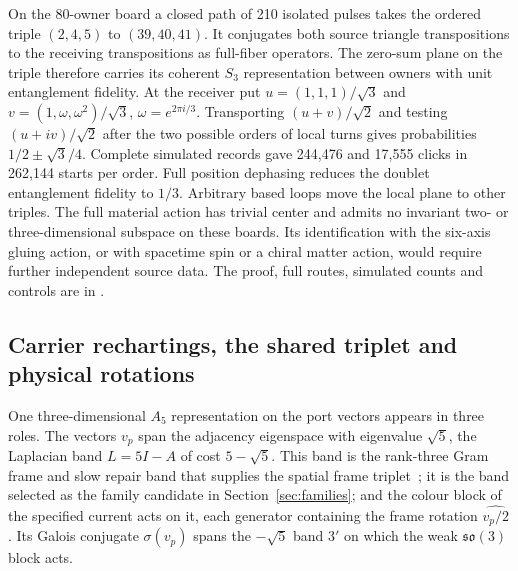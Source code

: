 \documentclass[11pt]{article}
\begin{document}
On the 80-owner board a closed path of 210 isolated pulses takes the ordered
triple \((2,4,5)\) to \((39,40,41)\). It conjugates both source triangle
transpositions to the receiving transpositions as full-fiber operators.
The zero-sum plane on the triple therefore carries its coherent \(S_3\)
representation between owners with unit entanglement fidelity. At the
receiver put \(u=(1,1,1)/\sqrt3\) and
\(v=(1,\omega,\omega^2)/\sqrt3\), \(\omega=e^{2\pi i/3}\). Transporting
\((u+v)/\sqrt2\) and testing \((u+iv)/\sqrt2\) after the two possible orders
of local turns gives probabilities \(1/2\pm\sqrt3/4\). Complete simulated
records gave 244,476 and 17,555 clicks in 262,144 starts per order. Full
position dephasing reduces the doublet entanglement fidelity to \(1/3\).
Arbitrary based loops move the local plane to other triples. The full
material action has trivial center and admits no invariant two- or
three-dimensional subspace on these boards. Its identification with the
six-axis gluing action, or with spacetime spin or a chiral matter action,
would require further independent source data. The proof, full routes,
simulated counts and controls are in
.

\subsection{Carrier rechartings, the shared triplet and physical rotations}
\label{sec:carrier-rotations}

One three-dimensional \(A_5\) representation on the port vectors appears in
three roles. The vectors \(v_p\) span the adjacency eigenspace with
eigenvalue \(\sqrt5\), the Laplacian band \(L=5I-A\) of cost \(5-\sqrt5\).
This band is the rank-three Gram frame and slow repair band that supplies the
spatial frame triplet~\cite{ophmicrophysics,ophEinstein}; it is the band selected as the
family candidate in Section~\ref{sec:families}; and the colour block of the
specified current acts on it, each generator containing the frame rotation
\(\widehat{v_p/2}\). Its Galois conjugate \(\sigma(v_p)\) spans the
\(-\sqrt5\) band \(3'\) on which the weak \(\mathfrak{so}(3)\) block acts.
\end{document}
